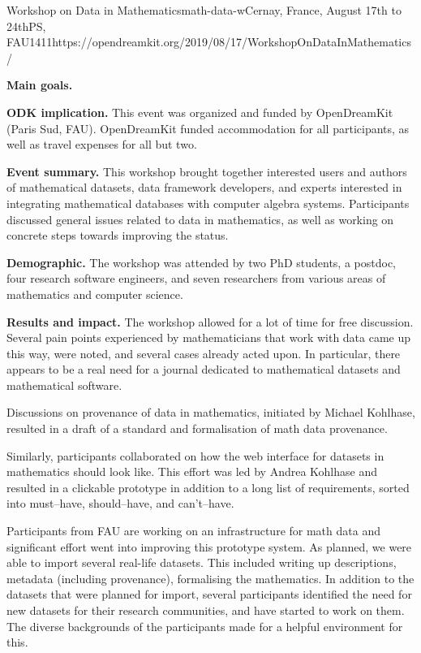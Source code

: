 \begin{event}{Workshop on Data in Mathematics}{math-data-w}{Cernay, France, August 17th to 24th}{PS, FAU}{14}{11}{https://opendreamkit.org/2019/08/17/WorkshopOnDataInMathematics/}

\textbf{Main goals.} 

\textbf{ODK implication.} This event was organized and funded by OpenDreamKit (Paris Sud, FAU). 
OpenDreamKit funded accommodation for all participants, as well as travel expenses for all but two.

\textbf{Event summary.} This workshop brought together interested users and authors of mathematical datasets, 
data framework developers, and experts interested in integrating mathematical databases with computer algebra systems.
Participants discussed general issues related to data in mathematics,
as well as working on concrete steps towards improving the status.

\textbf{Demographic.} The workshop was attended by 
two PhD students,
a postdoc,
four research software engineers,
and seven researchers from various areas of mathematics and computer science.

\textbf{Results and impact.} 
The workshop allowed for a lot of time for free discussion.
Several pain points experienced by mathematicians that work with data came up this way,
were noted, and several cases already acted upon.
In particular, there appears to be a real need for a journal dedicated to 
mathematical datasets and mathematical software.

Discussions on provenance of data in mathematics,
initiated by Michael Kohlhase, resulted in 
a draft of a standard and formalisation of math data provenance.

Similarly, participants collaborated on how the web interface
for datasets in mathematics should look like.
This effort was led by Andrea Kohlhase and resulted in 
a clickable prototype in addition to a long list of requirements,
sorted into must--have, should--have, and can't--have.

Participants from FAU are working on an infrastructure for math data and
significant effort went into improving this prototype system.
As planned, we were able to import several real-life datasets.
This included writing up descriptions, metadata (including provenance), 
formalising the mathematics.
In addition to the datasets that were planned for import,
several participants identified the need for new datasets for their 
research communities, and have started to work on them.
The diverse backgrounds of the participants made for a helpful
environment for this.


\end{event}

